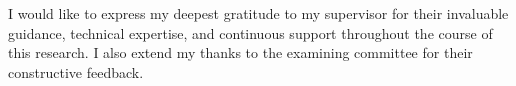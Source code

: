 \begin{acknowledgmentsenv}
    I would like to express my deepest gratitude to my supervisor for their invaluable guidance, technical expertise, and continuous support throughout the course of this research. I also extend my thanks to the examining committee for their constructive feedback.
\end{acknowledgmentsenv}